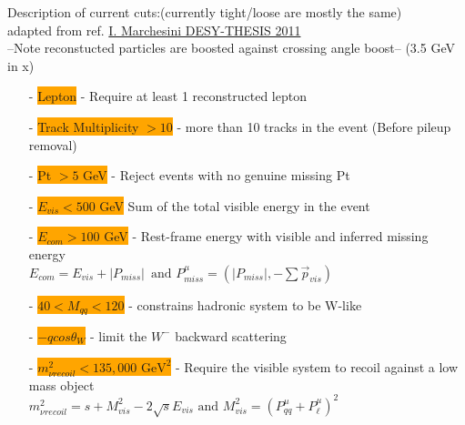 \documentclass[10pt]{beamer}
\begin{document}
\begin{frame}
Description of current cuts:(currently tight/loose are mostly the same)\\
\tiny
adapted from ref. \url{I. Marchesini DESY-THESIS 2011}\\
\scriptsize
--Note reconstucted particles are boosted against crossing angle boost-- (3.5 GeV in x)\\
\begin{itemize}
\item[-]\colorbox{orange}{Lepton} - Require at least 1 reconstructed lepton
\item[-]\colorbox{orange}{Track Multiplicity $> 10$} - more than 10 tracks in the event (Before pileup removal)
\item[-]\colorbox{orange}{Pt $> 5$ GeV} - Reject events with no genuine missing Pt 
\item[-]\colorbox{orange}{$E_{vis} < 500$ GeV} Sum of the total visible energy in the event 
\item[-]\colorbox{orange}{$E_{com} > 100$ GeV} - Rest-frame energy with visible and inferred missing energy\\  \quad $E_{com} = E_{vis} + |P_{miss}| \, \,  \, \text{and} \, \, P^\mu_{miss} = (|P_{miss}| , -\sum{\vec{p}_{vis}}) $
\item[-]\colorbox{orange}{$40<M_{qq}<120$} - constrains hadronic system to be W-like
\item[-]\colorbox{orange}{ $-qcos\theta_W$} - limit the $W^-$ backward scattering
\item[-]\colorbox{orange}{ $m^2_{\nu recoil} < 135,000 \, \, \text{GeV}^2$} - Require the visible system to recoil against a low mass object \\
\quad $m^2_{\nu recoil} = s + M^2_{vis} - 2\sqrt{s}E_{vis} \, \, \text{and} \, \, M^2_{vis} = ( P^{\mu}_{qq} +  P^{\mu}_{\ell})^2$ 

\end{itemize}
\end{frame}
\end{document}
